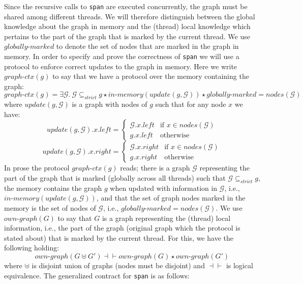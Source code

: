 \documentclass[]{scrartcl}
\def\MyMLe{\lstinline[language=MyML, basicstyle=\small\ttfamily, mathescape=true]}
\newcommand{\nodes}{\mathit{nodes}}
\newcommand{\inmem}{\mathit{in\text{-}memory}}
\newcommand{\localgr}{\mathit{own\text{-}graph}}
\newcommand{\globprot}{\mathit{graph\text{-}ctx}}
\newcommand{\globmark}{\mathit{globally\text{-}marked}}
\newcommand{\Left}{\mathit{left}}
\newcommand{\Right}{\mathit{right}}
\newcommand{\strictSG}{\subseteq_{\mathit{strict}}}
\begin{document}
Since the recursive calls to \MyMLe{span} are executed
concurrently, the graph must be shared among different threads.
We will therefore distinguish between the global knowledge
about the graph in memory and the (thread) local knowledge
which pertains to the part of the graph that is marked by the
current thread.
We use $\globmark$ to denote the set of nodes that
are marked in the graph in memory. 
In order to specify and prove the correctness of \MyMLe{span} we will use
a protocol to enforce correct updates to the graph in memory.
Here we write $\globprot(g)$ to say that we have a protocol over the memory containing the graph:
\[
\globprot(g) = \exists \mathcal{G}.~\mathcal{G} \strictSG g \star \inmem(\mathit{update}(g, \mathcal{G})) \star \globmark = \nodes(\mathcal{G})
\]
where $\mathit{update}(g, \mathcal{G})$ is a graph with nodes of $g$ such that for any node $x$ we have:
\[
\mathit{update}(g, \mathcal{G}).x.\Left = \left\{
\begin{array}{ll}
\mathcal{G}.x.\Left &\text{if } x \in \nodes(\mathcal{G})\\
g.x.\Left &\text{otherwise}
\end{array}
\right.
\]
\[
\mathit{update}(g, \mathcal{G}).x.\Right = \left\{
\begin{array}{ll}
\mathcal{G}.x.\Right &\text{if } x \in \nodes(\mathcal{G})\\
g.x.\Right &\text{otherwise}
\end{array}
\right.
\]
In prose the protocol $\globprot(g)$ reads; there is a graph $\mathcal{G}$ representing the part of the graph that is marked
(globally across all threads) such that $\mathcal{G} \strictSG g$,
the memory contains the graph $g$ when updated with
information in $\mathcal{G}$, i.e., $\inmem(\mathit{update}(g, \mathcal{G}))$, and that
the set of graph nodes marked in the memory is the set of nodes of $\mathcal{G}$, i.e., $\globmark = \nodes(\mathcal{G})$.
We use $\localgr(G)$ to say that $G$ is a graph representing
the (thread) local information, i.e., the part of the graph
(original graph which the protocol is stated about) that is marked by the current thread.
For this, we have the following holding:
\[
\localgr(G \uplus G') \dashv\vdash \localgr(G) \star \localgr(G')
\]
where $\uplus$ is disjoint union of graphs (nodes must be disjoint) and $\dashv\vdash$ is logical equivalence.
The generalized contract for \MyMLe{span} is as follows:
\end{document}
